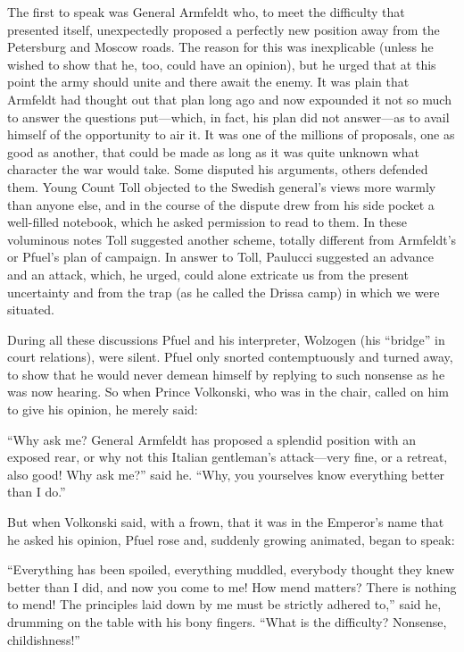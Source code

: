 The first to speak was General Armfeldt who, to meet the
difficulty that presented itself, unexpectedly proposed a
perfectly new position away from the Petersburg and Moscow
roads. The reason for this was inexplicable (unless he wished to
show that he, too, could have an opinion), but he urged that at
this point the army should unite and there await the enemy. It
was plain that Armfeldt had thought out that plan long ago and
now expounded it not so much to answer the questions put---which,
in fact, his plan did not answer---as to avail himself of the
opportunity to air it. It was one of the millions of proposals,
one as good as another, that could be made as long as it was
quite unknown what character the war would take. Some disputed
his arguments, others defended them. Young Count Toll objected to
the Swedish general's views more warmly than anyone else, and in
the course of the dispute drew from his side pocket a well-filled
notebook, which he asked permission to read to them. In these
voluminous notes Toll suggested another scheme, totally different
from Armfeldt's or Pfuel's plan of campaign. In answer to Toll,
Paulucci suggested an advance and an attack, which, he urged,
could alone extricate us from the present uncertainty and from
the trap (as he called the Drissa camp) in which we were
situated.

During all these discussions Pfuel and his interpreter, Wolzogen
(his ``bridge'' in court relations), were silent. Pfuel only
snorted contemptuously and turned away, to show that he would
never demean himself by replying to such nonsense as he was now
hearing. So when Prince Volkonski, who was in the chair, called
on him to give his opinion, he merely said:

``Why ask me? General Armfeldt has proposed a splendid position
with an exposed rear, or why not this Italian gentleman's
attack---very fine, or a retreat, also good! Why ask me?'' said
he. ``Why, you yourselves know everything better than I do.''

But when Volkonski said, with a frown, that it was in the
Emperor's name that he asked his opinion, Pfuel rose and,
suddenly growing animated, began to speak:

``Everything has been spoiled, everything muddled, everybody
thought they knew better than I did, and now you come to me! How
mend matters? There is nothing to mend! The principles laid down
by me must be strictly adhered to,'' said he, drumming on the
table with his bony fingers. ``What is the difficulty? Nonsense,
childishness!''

